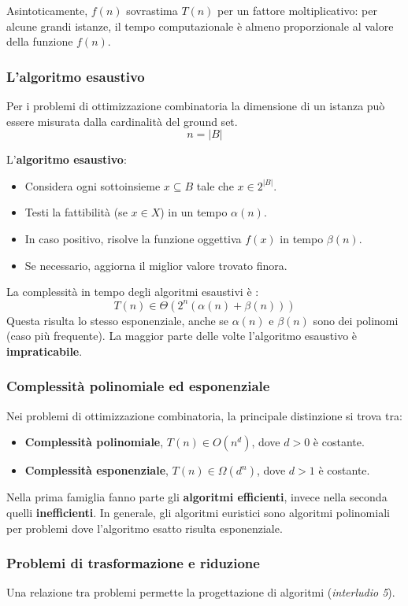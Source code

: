 \documentclass{article}
\begin{document}
Asintoticamente, $f(n)$ sovrastima $T(n)$ per un fattore moltiplicativo: per alcune grandi istanze,
il tempo computazionale è almeno proporzionale al valore della funzione $f(n)$.

\subsubsection{L'algoritmo esaustivo}
Per i problemi di ottimizzazione combinatoria la dimensione di un istanza può essere misurata
dalla cardinalità del ground set.
$$n=|B|$$

L'\textbf{algoritmo esaustivo}:
\begin{itemize}
    \item Considera ogni sottoinsieme $x\subseteq B$ tale che $x\in 2^{|B|}$.
    \item Testi la fattibilità (se $x\in X$) in un tempo $\alpha(n)$.
    \item In caso positivo, risolve la funzione oggettiva $f(x)$ in tempo $\beta(n)$.
    \item Se necessario, aggiorna il miglior valore trovato finora.
\end{itemize}

La complessità in tempo degli algoritmi esaustivi è :
$$T(n)\in\Theta\left( 2^n\left(\alpha(n)+\beta(n)\right) \right)$$
Questa risulta lo stesso esponenziale, anche se $\alpha(n)$ e $\beta(n)$ sono dei
polinomi (caso più frequente). La maggior parte delle volte l'algoritmo esaustivo
è \textbf{impraticabile}.

\subsubsection{Complessità polinomiale ed esponenziale}
Nei problemi di ottimizzazione combinatoria, la principale distinzione si trova tra:
\begin{itemize}
    \item \textbf{Complessità polinomiale}, $T(n)\in O(n^d)$, dove $d>0$ è costante.
    \item \textbf{Complessità esponenziale}, $T(n)\in\Omega(d^n)$, dove $d>1$ è costante.
\end{itemize}
Nella prima famiglia fanno parte gli \textbf{algoritmi efficienti}, invece nella seconda
quelli \textbf{inefficienti}. In generale, gli algoritmi euristici sono algoritmi polinomiali
per problemi dove l'algoritmo esatto risulta esponenziale.
\subsubsection{Problemi di trasformazione e riduzione}
Una relazione tra problemi permette la progettazione di algoritmi (\textit{interludio 5}).
\end{document}
